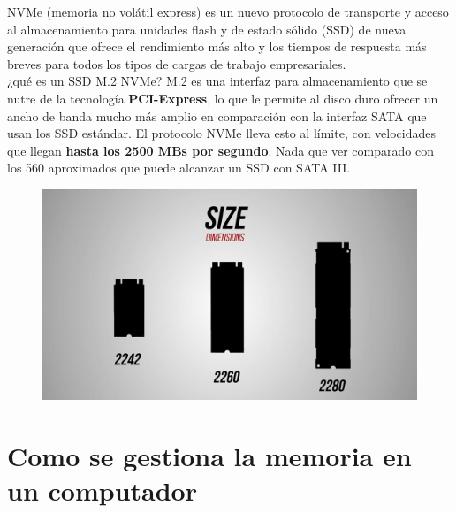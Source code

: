 \documentclass[10pt,letterpaper]{article}
\begin{document}
\begin{justify}
	\noindent
	NVMe (memoria no volátil express) es un nuevo protocolo de transporte y acceso al almacenamiento para unidades flash y de estado sólido (SSD) de nueva generación que ofrece el rendimiento más alto y los tiempos de respuesta más breves para todos los tipos de cargas de trabajo empresariales.\\
	
	\noindent
	¿qué es un SSD M.2 NVMe? M.2 es una interfaz para almacenamiento que se nutre de la tecnología \textbf{PCI-Express}, lo que le permite al disco duro ofrecer un ancho de banda mucho más amplio en comparación con la interfaz SATA que usan los SSD estándar. El protocolo NVMe lleva esto al límite, con velocidades que llegan \textbf{hasta los 2500 MBs por segundo}. Nada que ver comparado con los 560 aproximados que puede alcanzar un SSD con SATA III.\\
	
	\begin{figure}[h]
		\centering
		\includegraphics[scale=0.25]{images/dimensiones.jpg}
	\end{figure}
	

\end{justify}

\newpage
\noindent
\section{Como se gestiona la memoria en un computador} \label{contenido}
\end{document}
